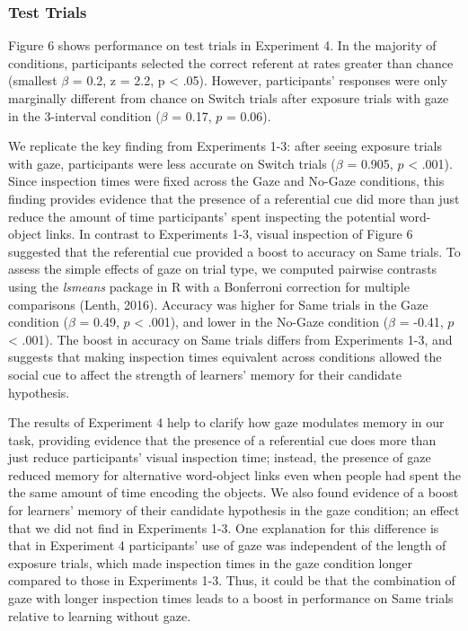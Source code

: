 \documentclass[authoryear, review]{elsarticle}
\begin{document}
\subsubsection{Test Trials}\label{test-trials-3}

Figure 6 shows performance on test trials in Experiment 4. In the
majority of conditions, participants selected the correct referent at
rates greater than chance (smallest \(\beta\) = 0.2, z = 2.2, p
\textless{} .05). However, participants' responses were only marginally
different from chance on Switch trials after exposure trials with gaze
in the 3-interval condition (\(\beta\) = 0.17, \(p\) = 0.06).

We replicate the key finding from Experiments 1-3: after seeing exposure
trials with gaze, participants were less accurate on Switch trials
(\(\beta\) = 0.905, \(p\) \textless{} .001). Since inspection times were
fixed across the Gaze and No-Gaze conditions, this finding provides
evidence that the presence of a referential cue did more than just
reduce the amount of time participants' spent inspecting the potential
word-object links. In contrast to Experiments 1-3, visual inspection of
Figure 6 suggested that the referential cue provided a boost to accuracy
on Same trials. To assess the simple effects of gaze on trial type, we
computed pairwise contrasts using the \emph{lsmeans} package in R with a
Bonferroni correction for multiple comparisons (Lenth, 2016). Accuracy
was higher for Same trials in the Gaze condition (\(\beta\) = 0.49,
\(p\) \textless{} .001), and lower in the No-Gaze condition (\(\beta\) =
-0.41, \(p\) \textless{} .001). The boost in accuracy on Same trials
differs from Experiments 1-3, and suggests that making inspection times
equivalent across conditions allowed the social cue to affect the
strength of learners' memory for their candidate hypothesis.

The results of Experiment 4 help to clarify how gaze modulates memory in
our task, providing evidence that the presence of a referential cue does
more than just reduce participants' visual inspection time; instead, the
presence of gaze reduced memory for alternative word-object links even
when people had spent the the same amount of time encoding the objects.
We also found evidence of a boost for learners' memory of their
candidate hypothesis in the gaze condition; an effect that we did not
find in Experiments 1-3. One explanation for this difference is that in
Experiment 4 participants' use of gaze was independent of the length of
exposure trials, which made inspection times in the gaze condition
longer compared to those in Experiments 1-3. Thus, it could be that the
combination of gaze with longer inspection times leads to a boost in
performance on Same trials relative to learning without gaze.
\end{document}
